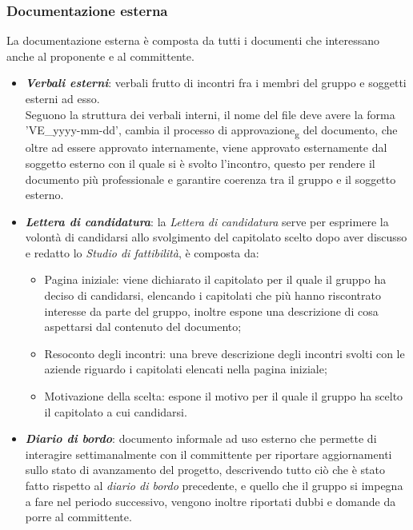         \subsubsection{Documentazione esterna}
        La documentazione esterna è composta da tutti i documenti che interessano anche al proponente e al committente.
        \begin{itemize}
            \item \textit{\textbf{Verbali esterni}}: verbali frutto di incontri fra i membri del gruppo e soggetti esterni ad esso.\\
            Seguono la struttura dei verbali interni, il nome del file deve avere la forma 'VE\_yyyy-mm-dd', cambia il processo di approvazione\textsubscript{g} del documento, che oltre ad essere approvato internamente, viene approvato esternamente dal soggetto esterno con il quale 
            si è svolto l'incontro, questo per rendere il documento più professionale e garantire coerenza tra il gruppo e il soggetto esterno.
            \item \textit{\textbf{Lettera di candidatura}}: la \textit{Lettera di candidatura} serve per esprimere la volontà di candidarsi allo svolgimento del capitolato scelto dopo aver discusso e redatto lo \textit{Studio di fattibilità}, 
            è composta da:
            \begin{itemize}
                \item Pagina iniziale: viene dichiarato il capitolato per il quale il gruppo ha deciso di candidarsi, elencando i capitolati che più hanno riscontrato interesse da parte del gruppo, 
                inoltre espone una descrizione di cosa aspettarsi dal contenuto del documento;
                \item Resoconto degli incontri: una breve descrizione degli incontri svolti con le aziende riguardo i capitolati elencati nella pagina iniziale;
                \item Motivazione della scelta: espone il motivo per il quale il gruppo ha scelto il capitolato a cui candidarsi.
            \end{itemize}
            \item \textit{\textbf{Diario di bordo}}: documento informale ad uso esterno che permette di interagire settimanalmente con il committente per riportare aggiornamenti sullo stato di avanzamento del progetto, descrivendo tutto ciò che è stato fatto rispetto al \textit{diario di bordo} precedente, 
            e quello che il gruppo si impegna a fare nel periodo successivo, vengono inoltre riportati dubbi e domande da porre al committente.

\end{itemize}
